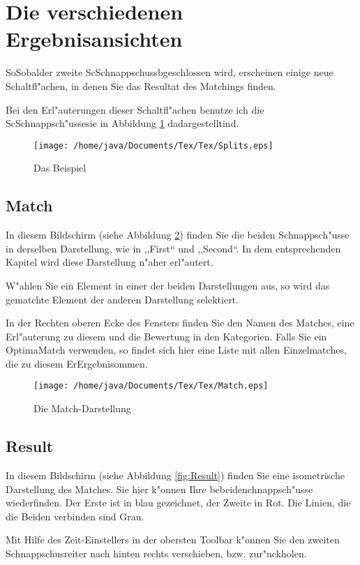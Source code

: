 \section{Die verschiedenen Ergebnisansichten}
SoSobalder zweite ScSchnappschussbgeschlossen wird, erscheinen einige neue Schaltfl"achen, in denen Sie das Resultat des Matchings finden.

Bei den Erl"auterungen dieser Schaltfl"achen benutze ich die ScSchnappsch"ussesie in Abbildung \ref{fig:Splits} dadargestelltind.
\begin{figure}
   \centering
   \texttt{[image: /home/java/Documents/Tex/Tex/Splits.eps]}
   \caption{Das Beispiel}
   \label{fig:Splits}
\end{figure}
\subsection{Match}
In diesem Bildschirm (siehe Abbildung \ref{fig:Match}) finden Sie die beiden Schnappsch"usse in derselben Darstellung, wie in ,,First`` und ,,Second``. In dem entsprechenden Kapitel wird diese Darstellung n"aher erl"autert. 

W"ahlen Sie ein Element in einer der beiden Darstellungen aus, so wird das gematchte Element der anderen Darstellung selektiert. 

In der Rechten oberen Ecke des Fensters finden Sie den Namen des Matches, eine Erl"auterung zu diesem und die Bewertung in den Kategorien. Falls Sie ein OptimaMatch verwenden, so findet sich hier eine Liste mit allen Einzelmatches, die zu diesem ErErgebnisommen.
\begin{figure}
   \centering
   \texttt{[image: /home/java/Documents/Tex/Tex/Match.eps]}
   \caption{Die Match-Darstellung}
   \label{fig:Match}
\end{figure}

\subsection{Result}
In diesem Bildschirm (siehe Abbildung \ref{fig:Result}) finden Sie eine isometrische Darstellung des Matches. Sie hier k"onnen Ihre bebeidenchnappsch"usse wiederfinden. Der Erste ist in blau gezeichnet, der Zweite in Rot. Die Linien, die die Beiden verbinden sind Grau. 

Mit Hilfe des Zeit-Einstellers in der obersten Toolbar k"onnen Sie den zweiten Schnappschusreiter nach hinten rechts verschieben, bzw. zur"uckholen. 

